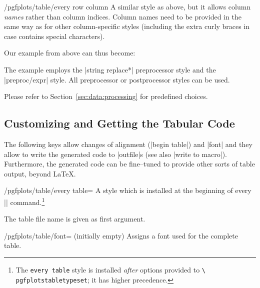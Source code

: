 \documentclass[a4paper]{ltxdoc}
\begin{document}
\begin{stylekey}{/pgfplots/table/every row  column }
    A similar style as above, but it allows column \emph{names} rather than
    column indices. Column names need to be provided in the same way as for
    other column-specific styles (including the extra curly braces in case
     contains special characters).

    Our example from above can thus become:
\begin{codeexample}[]
\end{codeexample}
    The example employs the |string replace*| preprocessor style and the
    |preproc/expr| style. All preprocessor or postprocessor styles can be used.

    Please refer to Section~\ref{sec:data:processing} for predefined choices.
\end{stylekey}


\subsection{Customizing and Getting the Tabular Code}

The following keys allow changes of alignment (|begin table|) and |font| and
they allow to write the generated code to |outfile|s (see also
|write to macro|). Furthermore, the generated code can be fine--tuned to
provide other sorts of table output, beyond \LaTeX{}.

\begin{stylekey}{/pgfplots/table/every table=}
    A style which is installed at the beginning of every
    |\pgfplotstabletypeset| command.\footnote{The \texttt{every table} style is
    installed \emph{after} options provided to \texttt{\textbackslash
    pgfplotstabletypeset}; it has higher precedence.}

    The table file name is given as first argument.
\end{stylekey}

\begin{key}{/pgfplots/table/font= (initially empty)}
    Assigns a font used for the complete table.
\end{key}
\end{document}
